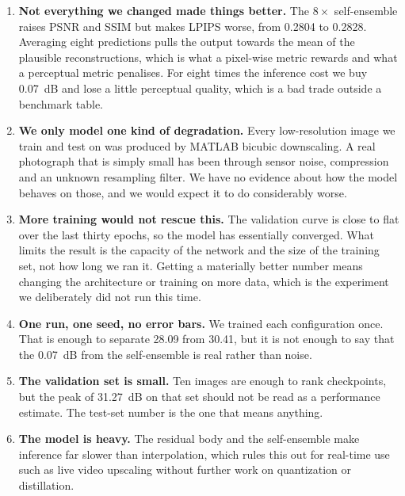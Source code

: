\documentclass[a4paper,11pt]{article}
\begin{document}
\begin{enumerate}
    \item \textbf{Not everything we changed made things better.} The $8\times$ self-ensemble raises
    PSNR and SSIM but makes LPIPS worse, from 0.2804 to 0.2828. Averaging eight predictions pulls the
    output towards the mean of the plausible reconstructions, which is what a pixel-wise metric
    rewards and what a perceptual metric penalises. For eight times the inference cost we buy
    0.07~dB and lose a little perceptual quality, which is a bad trade outside a benchmark table.

    \item \textbf{We only model one kind of degradation.} Every low-resolution image we train and
    test on was produced by MATLAB bicubic downscaling. A real photograph that is simply small has
    been through sensor noise, compression and an unknown resampling filter. We have no evidence
    about how the model behaves on those, and we would expect it to do considerably worse.

    \item \textbf{More training would not rescue this.} The validation curve is close to flat over
    the last thirty epochs, so the model has essentially converged. What limits the result is the
    capacity of the network and the size of the training set, not how long we ran it. Getting a
    materially better number means changing the architecture or training on more data, which is the
    experiment we deliberately did not run this time.

    \item \textbf{One run, one seed, no error bars.} We trained each configuration once. That is
    enough to separate 28.09 from 30.41, but it is not enough to say that the 0.07~dB from the
    self-ensemble is real rather than noise.

    \item \textbf{The validation set is small.} Ten images are enough to rank checkpoints, but the
    peak of 31.27~dB on that set should not be read as a performance estimate. The test-set number
    is the one that means anything.

    \item \textbf{The model is heavy.} The residual body and the self-ensemble make inference far
    slower than interpolation, which rules this out for real-time use such as live video upscaling
    without further work on quantization or distillation.
\end{enumerate}
\end{document}
